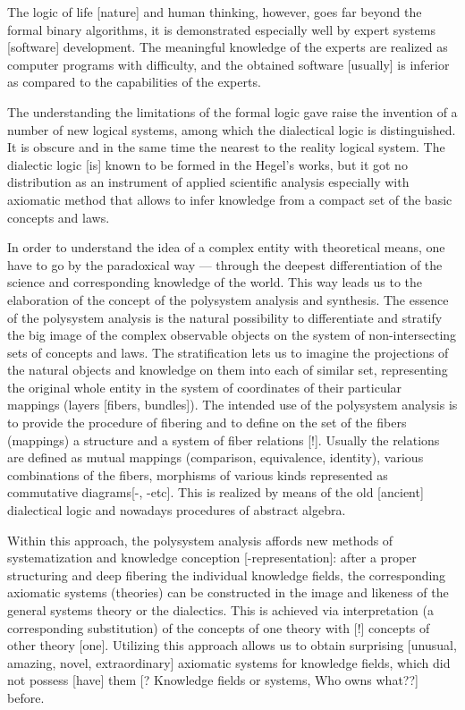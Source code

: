 \documentclass[12pt,leqno]{book}
\begin{document}
The logic of life [nature] and human thinking, however, goes far beyond the formal binary algorithms, it is demonstrated especially well by expert systems [software] development. The meaningful knowledge of the experts are realized as computer programs with difficulty, and the obtained software [usually] is inferior as compared to the capabilities of the experts.

The understanding the limitations of the formal logic gave raise the invention of a number of new logical systems, among which the dialectical logic is distinguished. It is obscure and in the same time the nearest to the reality logical system. The dialectic logic [is] known to be formed in the Hegel's works, but it got no distribution as an instrument of applied scientific analysis especially with axiomatic method that allows to infer knowledge from a compact set of the basic concepts and laws.

In order to understand the idea of a complex entity with theoretical means, one have to go by the paradoxical way --- through the deepest differentiation of the science and corresponding knowledge of the world. This way leads us to the elaboration of the concept of the polysystem analysis and synthesis. The essence of the polysystem analysis is the natural possibility to differentiate and stratify the big image of the complex observable objects on the system of non-intersecting sets of concepts and laws. The stratification lets us to imagine the projections of the natural objects and knowledge on them into each of similar set, representing the original whole entity in the system of coordinates of their particular mappings (layers [fibers, bundles]). The intended use of the polysystem analysis is to provide the procedure of fibering and to define on the set of the fibers (mappings) a structure and a system of fiber relations [!]. Usually the relations are defined as mutual mappings (comparison, equivalence, identity), various combinations of the fibers, morphisms of various kinds represented as commutative diagrams[-, -etc]. This is realized by means of the old [ancient] dialectical logic and nowadays procedures of abstract algebra.

Within this approach, the polysystem analysis affords new methods of systematization and knowledge conception [-representation]: after a proper structuring and deep fibering the individual knowledge fields, the corresponding axiomatic systems (theories) can be constructed in the image and likeness of the general systems theory or the dialectics. This is achieved via interpretation (a corresponding substitution) of the concepts of one theory with [!] concepts of other theory [one]. Utilizing this approach allows us to obtain surprising [unusual, amazing, novel, extraordinary] axiomatic systems for knowledge fields, which did not possess [have] them [? Knowledge fields or systems, Who owns what??] before.
\end{document}
